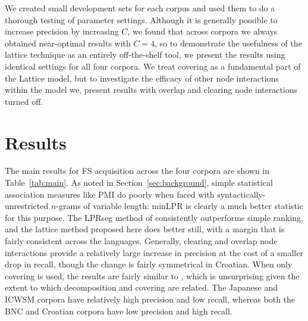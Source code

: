 \documentclass[11pt,letterpaper]{article}
\newcommand{\tabref}[2][]{Table#1~\ref{#2}\xspace}
\newcommand{\secref}[2][]{Section#1~\ref{#2}\xspace}
\begin{document}


We created small development sets for each corpus and used them to do a thorough testing of parameter settings. Although it is generally possible to increase precision by increasing $C$, we found that across corpora we always obtained near-optimal results with $C=4$, so to demonstrate the usefulness of the lattice technique as an entirely off-the-shelf tool, we present the results using identical settings for all four corpora. We treat covering as a fundamental part of the Lattice model, but to investigate the efficacy of other node interactions within the model we, present results with overlap and clearing node interactions turned off.
		

\section{Results}

The main results for FS acquisition across the four corpora are shown in \tabref{tab:main}. As noted in \secref{sec:background}, simple statistical association measures like PMI do poorly when faced with syntactically-unrestricted $n$-grams of variable length: minLPR is clearly a much better statistic for this purpose. The LPRseg method of  consistently outperforms simple ranking, and the lattice method proposed here does better still, with a margin that is fairly consistent across the languages. Generally, clearing and overlap node interactions provide a relatively large increase in precision at the cost of a smaller drop in recall, though the change is fairly symmetrical in Croatian.  When only covering is used, the results are fairly similar to , which is unsurprising given the extent to which decomposition and covering are related. The Japanese and ICWSM corpora have relatively high precision and low recall, whereas both the BNC and Croatian corpora have low precision and high recall.
\end{document}
